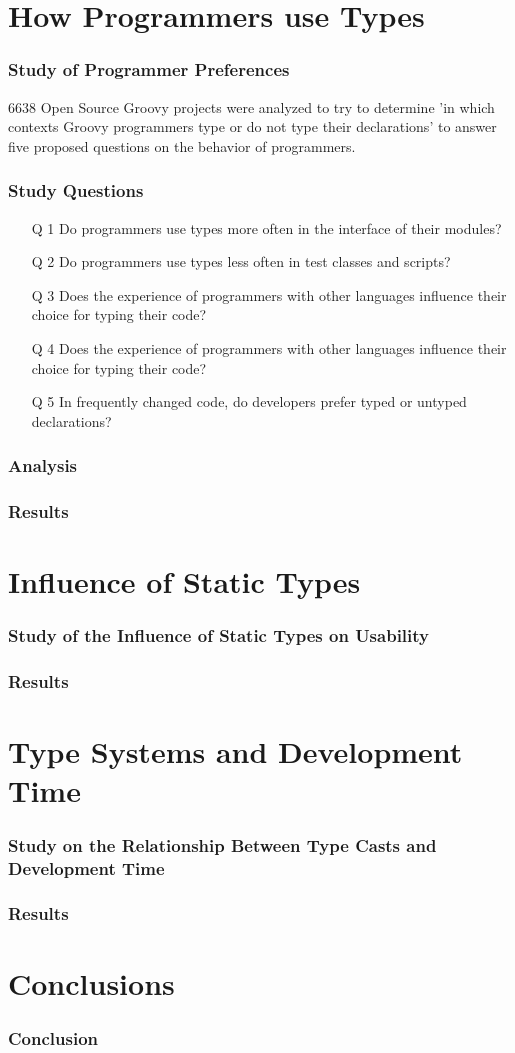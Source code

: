 \documentclass{beamer}
\begin{document}
\section{How Programmers use Types}
\begin{frame}
	\frametitle{Study of Programmer Preferences}
		6638 Open Source Groovy projects were analyzed to try to determine 'in which contexts Groovy programmers type or do not type their declarations' to answer five proposed questions on the behavior of programmers.
\end{frame}
\begin{frame}
	\frametitle{Study Questions}
	\begin{itemize}
	\item[Q 1] Do programmers use types more often in the
interface of their modules?
	\item[Q 2]Do programmers use types less often in test
classes and scripts?
	\item[Q 3]Does the experience of programmers with
other languages influence their choice for typing their code?
	\item[Q 4]Does the experience of programmers with
other languages influence their choice for typing their code?
	\item[Q 5]In frequently changed code, do developers
prefer typed or untyped declarations?
	\end{itemize}
\end{frame}
\begin{frame}
	\frametitle{Analysis}
	
\end{frame}
\begin{frame}
	\frametitle{Results}
\end{frame}
	
\section{Influence of Static Types}
\begin{frame}
	\frametitle{Study of the Influence of Static Types on Usability}
\end{frame}
\begin{frame}
	\frametitle{Results}
\end{frame}
	
\section{Type Systems and Development Time}
\begin{frame}
	\frametitle{Study on the Relationship Between Type Casts and Development Time}
\end{frame}
\begin{frame}
	\frametitle{Results}
\end{frame}
	
\section{Conclusions}
\begin{frame}
	\frametitle{Conclusion}
\end{frame}
\end{document}
